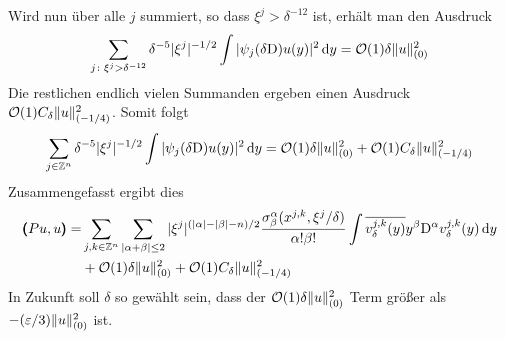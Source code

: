 Wird nun über alle $j$ summiert, so dass $\xi^j>\delta^{-12}$ ist, erhält man den Ausdruck
\begin{align*}
\sum_{j\colon \xi^j>\delta^{-12}} \delta^{-5} |\xi^j|^{-1/2}\int |\psi_j(\delta\mathrm D)u(y)|^2\,\mathrm d y = \mathcal O(1)\delta\lVert u\rVert _{(0)}^2
\end{align*}
Die restlichen endlich vielen Summanden ergeben einen Ausdruck $\mathcal O(1)C_\delta \lVert u\rVert _{(-1/4)}^2$. Somit folgt
\begin{align*}
\sum_{j\in\mathbb Z^n}\delta^{-5} |\xi^j|^{-1/2}\int |\psi_j(\delta\mathrm D)u(y)|^2\,\mathrm d y = \mathcal O(1)\delta\lVert u\rVert _{(0)}^2 + \mathcal O(1)C_\delta \lVert u\rVert _{(-1/4)}^2
\end{align*}
Zusammengefasst ergibt dies
\begin{align*}
\pmb(Pu,u\pmb)
=& \sum_{j,k\in\mathbb Z^n}\sum_{\lvert\alpha+\beta\rvert\le 2}|\xi^j|^{(\lvert\alpha\rvert-\lvert\beta\rvert-n)/2} \frac{\sigma^\alpha_\beta(x^{j,k},\xi^j/\delta)}{\alpha!\beta!}\int\overline{v^{j,k}_\delta(y)}y^\beta\mathrm D^\alpha v^{j,k}_\delta(y)\,\mathrm d y\\
&+\mathcal O(1)\delta\lVert u\rVert _{(0)}^2 + \mathcal O(1)C_\delta \lVert u\rVert _{(-1/4)}^2\nonumber
\end{align*}
In Zukunft soll $\delta$ so gewählt sein, dass der $\mathcal O(1)\delta\lVert u\rVert ^2_{(0)}$ Term größer als $-(\varepsilon/3)\lVert u\rVert ^2_{(0)}$ ist.
